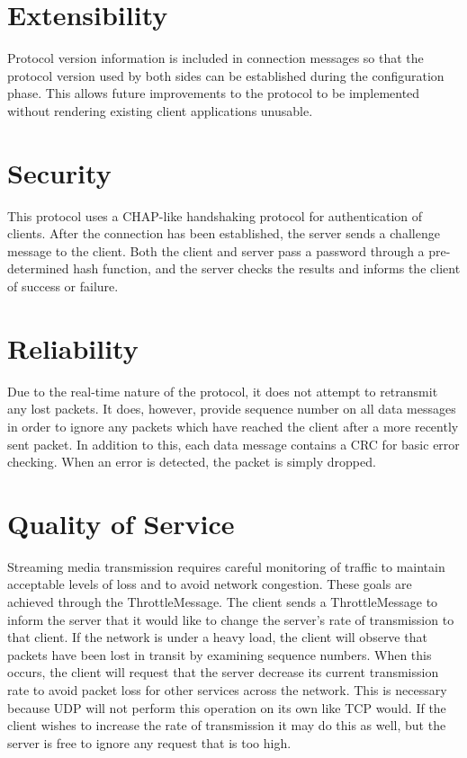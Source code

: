 \documentclass[12pt,letterpaper,titlepage]{article}
\begin{document}


\section{Extensibility}
Protocol version information is included in connection messages so that the protocol version used by both sides can be established during the configuration phase.  This allows future improvements to the protocol to be implemented without rendering existing client applications unusable.

\section{Security}
\label{sec:security}
This protocol uses a CHAP-like handshaking protocol for authentication of clients.  After the connection has been established, the server sends a challenge message to the client.  Both the client and server pass a password through a pre-determined hash function, and the server checks the results and informs the client of success or failure.

\section{Reliability}
Due to the real-time nature of the protocol, it does not attempt to retransmit any lost packets. It does, however, provide sequence number on all data messages in order to ignore any packets which have reached the client after a more recently sent packet. In addition to this, each data message contains a CRC for basic error checking. When an error is detected, the packet is simply dropped.

\section{Quality of Service}
Streaming media transmission requires careful monitoring of traffic to maintain acceptable levels of loss and to avoid network congestion. These goals are achieved through the ThrottleMessage. The client sends a ThrottleMessage to inform the server that it would like to change the server's rate of transmission to that client. If the network is under a heavy load, the client will observe that packets have been lost in transit by examining sequence numbers. When this occurs, the client will request that the server decrease its current transmission rate to avoid packet loss for other services across the network. This is necessary because UDP will not perform this operation on its own like TCP would. If the client wishes to increase the rate of transmission it may do this as well, but the server is free to ignore any request that is too high.
\end{document}
